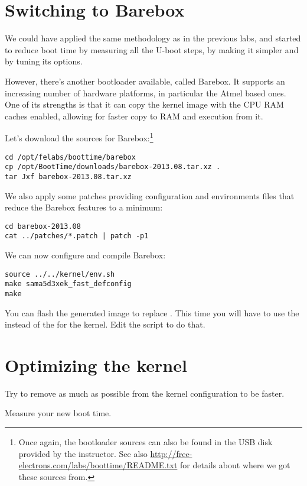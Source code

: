 
\section{Switching to Barebox}

We could have applied the same methodology as in the previous labs, and
started to reduce boot time by measuring all the U-boot steps, by making
it simpler and by tuning its options.

However, there's another bootloader available, called Barebox. It
supports an increasing number of hardware platforms, in particular the
Atmel based ones. One of its strengths is that it can copy the kernel
image with the CPU RAM caches enabled, allowing for faster copy to RAM
and execution from it.

Let's download the sources for Barebox:\footnote{Once again, the
bootloader sources can also be found in the USB disk provided by
the instructor. See also \url{http://free-electrons.com/labs/boottime/README.txt}
for details about where we got these sources from.}

\begin{verbatim}
cd /opt/felabs/boottime/barebox
cp /opt/BootTime/downloads/barebox-2013.08.tar.xz .
tar Jxf barebox-2013.08.tar.xz
\end{verbatim}

We also apply some patches providing configuration and environments files
that reduce the Barebox features to a minimum:

\begin{verbatim}
cd barebox-2013.08
cat ../patches/*.patch | patch -p1
\end{verbatim}

We can now configure and compile Barebox:

\begin{verbatim}
source ../../kernel/env.sh
make sama5d3xek_fast_defconfig
make
\end{verbatim}

You can flash the generated image  to
replace . This time you will have to use the
 instead of the  for the kernel. Edit the
 script to do that.

\section{Optimizing the kernel}

Try to remove as much as possible from the kernel configuration to be
faster.

Measure your new boot time.
